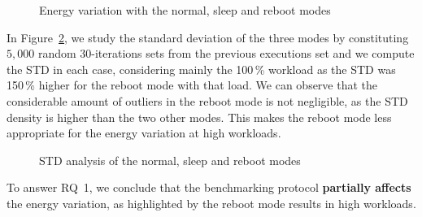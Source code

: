 \begin{figure}
    \caption{Energy variation with the \textsf{normal}, \textsf{sleep} and \textsf{reboot} modes}\label{fig:running-process}
\end{figure}

In Figure~\ref{fig:reboot}, we study the standard deviation of the three modes by constituting $5,000$ random 30-iterations sets from the previous executions set and we compute the STD in each case, considering mainly the 100\,\% workload as the STD was 150\,\% higher for the \textsf{reboot} mode with that load.
We can observe that the considerable amount of outliers in the \textsf{reboot} mode is not negligible, as the STD density is higher than the two other modes.
This makes the \textsf{reboot} mode less appropriate for the energy variation at high workloads.

\begin{figure}
    \caption{STD analysis of the \textsf{normal}, \textsf{sleep} and \textsf{reboot} modes}\label{fig:reboot}
\end{figure}

\begin{mdframed}[skipabove=\topsep,skipbelow=\topsep]

    To answer \textsc{RQ~1}, we conclude that the benchmarking protocol \textbf{partially affects} the energy variation, as highlighted by the \textsf{reboot} mode results in high workloads.

\end{mdframed}


